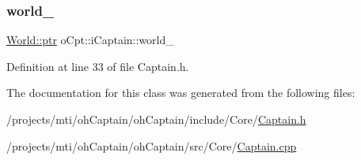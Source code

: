 \hypertarget{classo_cpt_1_1i_captain_a6e08906c347d5fc66605bfde73046194}{}\label{classo_cpt_1_1i_captain_a6e08906c347d5fc66605bfde73046194} 
\subsubsection{\texorpdfstring{world\+\_\+}{world\_}}
{\footnotesize\ttfamily \hyperlink{classo_cpt_1_1_world_aa6e591e3096d5de71e0cec9039663d67}{World\+::ptr} o\+Cpt\+::i\+Captain\+::world\+\_\+\hspace{0.3cm}{\ttfamily [protected]}}



Definition at line 33 of file Captain.\+h.



The documentation for this class was generated from the following files\+:\begin{DoxyCompactItemize}
\item 
/projects/mti/oh\+Captain/oh\+Captain/include/\+Core/\hyperlink{_captain_8h}{Captain.\+h}\item 
/projects/mti/oh\+Captain/oh\+Captain/src/\+Core/\hyperlink{_captain_8cpp}{Captain.\+cpp}\end{DoxyCompactItemize}
